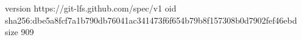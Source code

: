 version https://git-lfs.github.com/spec/v1
oid sha256:dbe5a8fcf7a1b790db76041ac341473f6f654b79b8f157308b0d7902fef46ebd
size 909
